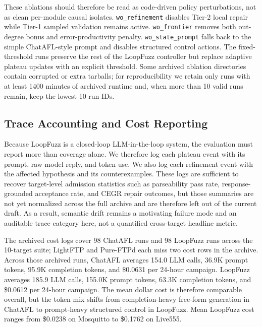 \documentclass[conference]{IEEEtran}
\begin{document}
These ablations should therefore be read as code-driven policy perturbations, not as clean per-module causal isolates. \texttt{wo\_refinement} disables Tier-2 local repair while Tier-1 sampled validation remains active. \texttt{wo\_frontier} removes both out-degree bonus and error-productivity penalty. \texttt{wo\_state\_prompt} falls back to the simple ChatAFL-style prompt and disables structured control actions. The fixed-threshold runs preserve the rest of the LoopFuzz controller but replace adaptive plateau updates with an explicit threshold. Some archived ablation directories contain corrupted or extra tarballs; for reproducibility we retain only runs with at least 1400 minutes of archived runtime and, when more than 10 valid runs remain, keep the lowest 10 run IDs.

\subsection{Trace Accounting and Cost Reporting}
Because LoopFuzz is a closed-loop LLM-in-the-loop system, the evaluation must report more than coverage alone. We therefore log each plateau event with its prompt, raw model reply, and token use. We also log each refinement event with the affected hypothesis and its counterexamples. These logs are sufficient to recover target-level admission statistics such as parseability pass rate, response-grounded acceptance rate, and CEGR repair outcomes, but those summaries are not yet normalized across the full archive and are therefore left out of the current draft. As a result, semantic drift remains a motivating failure mode and an auditable trace category here, not a quantified cross-target headline metric.

The archived cost logs cover 98 ChatAFL runs and 98 LoopFuzz runs across the 10-target suite; LightFTP and Pure-FTPd each miss two cost rows in the archive. Across those archived runs, ChatAFL averages 154.0 LLM calls, 36.9K prompt tokens, 95.9K completion tokens, and \$0.0631 per 24-hour campaign. LoopFuzz averages 185.9 LLM calls, 155.0K prompt tokens, 63.3K completion tokens, and \$0.0612 per 24-hour campaign. The mean dollar cost is therefore comparable overall, but the token mix shifts from completion-heavy free-form generation in ChatAFL to prompt-heavy structured control in LoopFuzz. Mean LoopFuzz cost ranges from \$0.0238 on Mosquitto to \$0.1762 on Live555.
\end{document}
